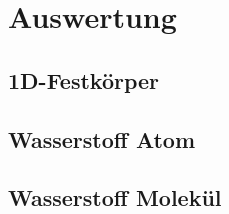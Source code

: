 \section{Auswertung}
\label{sec:Auswertung}

\subsection{1D-Festkörper}

\subsection{Wasserstoff Atom}

\subsection{Wasserstoff Molekül}